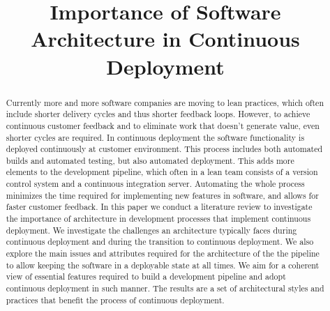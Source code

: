 \documentclass[conference]{IEEEtran}
\begin{document}
\title{Importance of Software Architecture in Continuous Deployment}

\author{
}

\maketitle


\begin{abstract}
Currently more and more software companies are moving to lean practices, which often include shorter delivery cycles and thus shorter feedback loops. However, to achieve continuous customer feedback and to eliminate work that doesn't generate value, even shorter cycles are required. In continuous deployment the software functionality is deployed continuously at customer environment. This process includes both automated builds and automated testing, but also automated deployment. This adds more elements to the development pipeline, which often in a lean team consists of a version control system and a continuous integration server. Automating the whole process minimizes the time required for implementing new features in software, and allows for faster customer feedback. In this paper we conduct a literature review to investigate the importance of architecture in development processes that implement continuous deployment. We investigate the challenges an architecture typically faces during continuous deployment and during the transition to continuous deployment. We also explore the main issues and attributes required for the architecture of the the pipeline to allow keeping the software in a deployable state at all times. We aim for a coherent view of essential features required to build a development pipeline and adopt continuous deployment in such manner. The results are a set of architectural styles and practices that benefit the process of continuous deployment.

\end{abstract}
\end{document}
